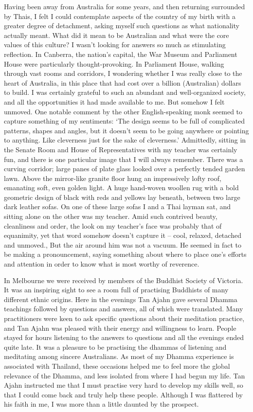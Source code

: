 Having been away from Australia for some years, and then returning
surrounded by Thais, I felt I could contemplate aspects of the country
of my birth with a greater degree of detachment, asking myself such
questions as what nationality actually meant. What did it mean to be
Australian and what were the core values of this culture? I wasn't
looking for answers so much as stimulating reflection. In Canberra, the
nation's capital, the War Museum and Parliament House were particularly
thought-provoking. In Parliament House, walking through vast rooms and
corridors, I wondering whether I was really close to the heart of
Australia, in this place that had cost over a billion (Australian) 
dollars to build. I was certainly grateful to such an abundant and
well-organized society, and all the opportunities it had made available
to me. But somehow I felt unmoved. One notable comment by the other
English-speaking monk seemed to capture something of my sentiments: `The
design seems to be full of complicated patterns, shapes and angles, but
it doesn't seem to be going anywhere or pointing to anything. Like
cleverness just for the sake of cleverness.' Admittedly, sitting in the
Senate Room and House of Representatives with my teacher was certainly
fun, and there is one particular image that I will always remember. 
There was a curving corridor; large panes of plate glass looked over a
perfectly tended garden lawn. Above the mirror-like granite floor hung
an impressively lofty roof, emanating soft, even golden light. A huge
hand-woven woollen rug with a bold geometric design of black with reds
and yellows lay beneath, between two large dark leather sofas. On one of
these large sofas I and a Thai layman sat, and sitting alone on the
other was my teacher. Amid such contrived beauty, cleanliness and order, 
the look on my teacher's face was probably that of equanimity, yet that
word somehow doesn't capture it -- cool, relaxed, detached and unmoved., 
But the air around him was not a vacuum. He seemed in fact to be making
a pronouncement, saying something about where to place one's efforts and
attention in order to know what is most worthy of reverence. 

In Melbourne we were received by members of the Buddhist Society of
Victoria. It was an inspiring sight to see a room full of practising
Buddhists of many different ethnic origins. Here in the evenings Tan
Ajahn gave several Dhamma teachings followed by questions and answers, 
all of which were translated. Many practitioners were keen to ask
specific questions about their meditation practice, and Tan Ajahn was
pleased with their energy and willingness to learn. People stayed for
hours listening to the answers to questions and all the evenings ended
quite late. It was a pleasure to be practising the dhammas of listening
and meditating among sincere Australians. As most of my Dhamma
experience is associated with Thailand, these occasions helped me to
feel more the global relevance of the Dhamma, and less isolated from
where I had begun my life. Tan Ajahn instructed me that I must practise
very hard to develop my skills well, so that I could come back and truly
help these people. Although I was flattered by his faith in me, I was
more than a little daunted by the prospect. 

